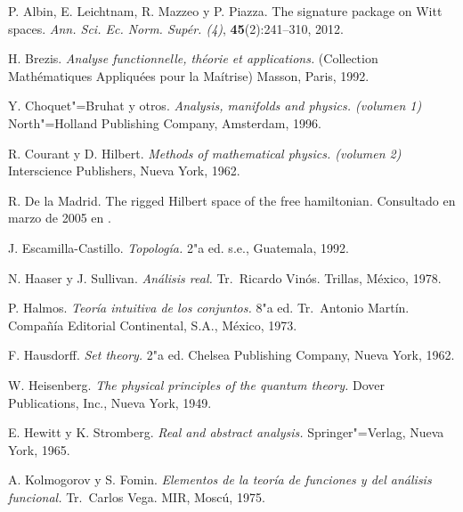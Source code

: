 \begin{thebibliography}{99}

 P. Albin, E. Leichtnam, R. Mazzeo y P. Piazza. The signature package on Witt spaces. \textit{Ann. Sci. Ec. Norm. Supér. (4)}, \textbf{45}(2):241--310, 2012.

 H. Brezis. \textit{Analyse functionnelle, théorie et applications.} (Collection Mathématiques Appliquées pour la Maítrise) Masson, Paris, 1992.

 Y. Choquet"=Bruhat y otros. \textit{Analysis, manifolds and physics. (volumen 1)} North"=Holland Publishing Company, Amsterdam, 1996.

 R. Courant y {D. Hilbert}. \textit{Methods of mathematical physics. (volumen 2)} Interscience Publishers, Nueva York, 1962.

 R. {De la Madrid}. The rigged {Hilbert} space of the free hamiltonian. Consultado en marzo de 2005 en .

 J. Escamilla-Castillo. \textit{Topología.} 2"a ed. s.e., Guatemala, 1992.

 N. Haaser y {J. Sullivan}. \textit{Análisis real.}  Tr.~Ricardo Vinós. Trillas, México, 1978.

 P. Halmos. \textit{Teoría intuitiva de los conjuntos.} 8"a ed. Tr.~Antonio Martín. Compañía Editorial Continental, S.A., México, 1973.

 F. Hausdorff. \textit{Set theory.} 2"a ed. Chelsea Publishing Company, Nueva York, 1962.

 W. Heisenberg. \textit{The physical principles of the quantum theory.} Dover Publications, Inc., Nueva York, 1949.

 E. Hewitt y {K. Stromberg}. \textit{Real and abstract analysis.} Springer"=Verlag, Nueva York, 1965.

 A. Kolmogorov y {S. Fomin}. \textit{Elementos de la teoría de funciones y del análisis funcional.} Tr.~Carlos Vega. MIR, Moscú, 1975.


\end{thebibliography}
